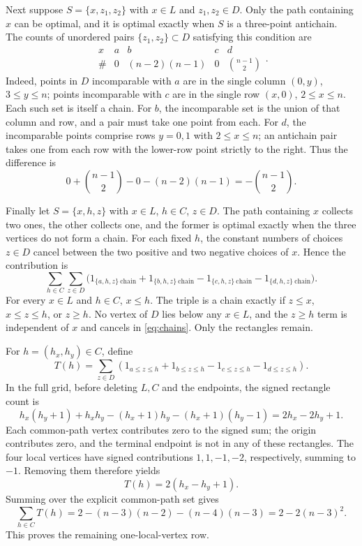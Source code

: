 \documentclass[11pt,a4paper]{article}
\begin{document}
Next suppose $S=\{x,z_1,z_2\}$ with $x\in L$ and $z_1,z_2\in D$.
Only the path containing $x$ can be optimal, and it is optimal
exactly when $S$ is a three-point antichain. The counts of unordered
pairs $\{z_1,z_2\}\subset D$ satisfying this condition are
\[
 \begin{array}{c|rrrr}
 x&a&b&c&d\\ \hline
 \#&0&(n-2)(n-1)&0&\binom{n-1}{2}
 \end{array}.
\]
Indeed, points in $D$ incomparable with $a$ are in the single
column $(0,y)$, $3\le y\le n$; points incomparable with $c$ are
in the single row $(x,0)$, $2\le x\le n$. Each such set is itself
a chain. For $b$, the incomparable set is the union of that column
and row, and a pair must take one point from each. For $d$, the
incomparable points comprise rows $y=0,1$ with $2\le x\le n$;
an antichain pair takes one from each row with the lower-row point
strictly to the right. Thus the difference is
\[
 0+\binom{n-1}{2}-0-(n-2)(n-1)
 =-\binom{n-1}{2}.
\]

Finally let $S=\{x,h,z\}$ with $x\in L$, $h\in C$, $z\in D$.
The path containing $x$ collects two ones, the other collects one,
and the former is optimal exactly when the three vertices do not
form a chain. For each fixed $h$, the constant numbers of choices
$z\in D$ cancel between the two positive and two negative choices
of $x$. Hence the contribution is
\begin{equation}\label{eq:chains}
\sum_{h\in C}\sum_{z\in D}
 \bigl(1_{\{a,h,z\}\ \mathrm{chain}}
      +1_{\{b,h,z\}\ \mathrm{chain}}
      -1_{\{c,h,z\}\ \mathrm{chain}}
      -1_{\{d,h,z\}\ \mathrm{chain}}\bigr).
\end{equation}
For every $x\in L$ and $h\in C$, $x\le h$. The triple is a chain
exactly if $z\le x$, $x\le z\le h$, or $z\ge h$. No vertex of
$D$ lies below any $x\in L$, and the $z\ge h$ term is independent
of $x$ and cancels in \eqref{eq:chains}. Only the rectangles remain.

For $h=(h_x,h_y)\in C$, define
\[
 T(h)=\sum_{z\in D}
 \left(1_{a\le z\le h}+1_{b\le z\le h}
       -1_{c\le z\le h}-1_{d\le z\le h}\right).
\]
In the full grid, before deleting $L,C$ and the endpoints, the
signed rectangle count is
\[
 h_x(h_y+1)+h_xh_y-(h_x+1)h_y-(h_x+1)(h_y-1)
 =2h_x-2h_y+1.
\]
Each common-path vertex contributes zero to the signed sum;
the origin contributes zero, and the terminal endpoint is not in
any of these rectangles. The four local vertices have signed
contributions $1,1,-1,-2$, respectively, summing to $-1$.
Removing them therefore yields
\[
 T(h)=2(h_x-h_y+1).
\]
Summing over the explicit common-path set gives
\[
 \sum_{h\in C}T(h)
 =2-(n-3)(n-2)-(n-4)(n-3)
 =2-2(n-3)^2.
\]
This proves the remaining one-local-vertex row.
\end{document}

